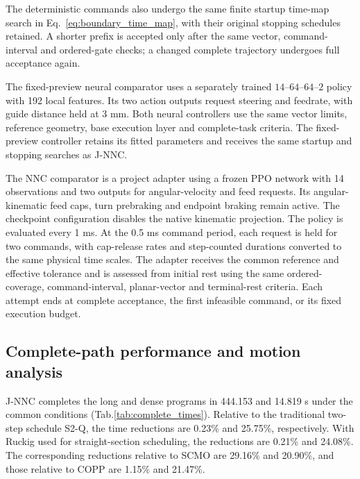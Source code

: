 \documentclass[preprint,12pt]{elsarticle}
\begin{document}
The deterministic commands also undergo the same finite startup time-map search in Eq.~\eqref{eq:boundary_time_map}, with their original stopping schedules retained. A shorter prefix is accepted only after the same vector, command-interval and ordered-gate checks; a changed complete trajectory undergoes full acceptance again.

The fixed-preview neural comparator uses a separately trained $14$--$64$--$64$--$2$ policy with 192 local features. Its two action outputs request steering and feedrate, with guide distance held at 3 mm. Both neural controllers use the same vector limits, reference geometry, base execution layer and complete-task criteria. The fixed-preview controller retains its fitted parameters and receives the same startup and stopping searches as J-NNC.

The NNC comparator is a project adapter using a frozen PPO network with 14 observations and two outputs for angular-velocity and feed requests. Its angular-kinematic feed caps, turn prebraking and endpoint braking remain active. The checkpoint configuration disables the native kinematic projection. The policy is evaluated every 1 ms. At the 0.5 ms command period, each request is held for two commands, with cap-release rates and step-counted durations converted to the same physical time scales. The adapter receives the common reference and effective tolerance and is assessed from initial rest using the same ordered-coverage, command-interval, planar-vector and terminal-rest criteria. Each attempt ends at complete acceptance, the first infeasible command, or its fixed execution budget.



\subsection{Complete-path performance and motion analysis}
J-NNC completes the long and dense programs in 444.153{} and 14.819{} s under the common conditions (Tab.\nobreakspace\ref{tab:complete_times}). Relative to the traditional two-step schedule S2-Q, the time reductions are 0.23\% and 25.75\%, respectively. With Ruckig used for straight-section scheduling, the reductions are 0.21\% and 24.08\%. The corresponding reductions relative to SCMO are 29.16\% and 20.90\%, and those relative to COPP are 1.15\% and 21.47\%.
\end{document}
